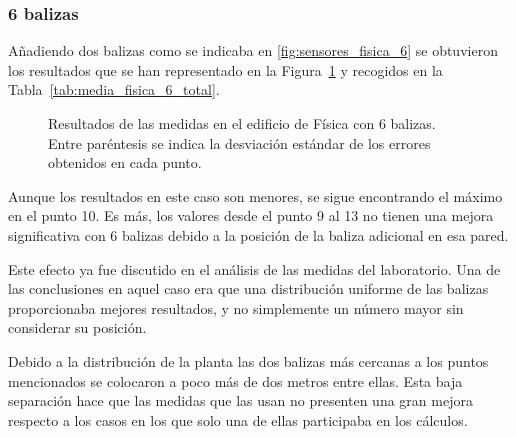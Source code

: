 \subsubsection{6 balizas}

Añadiendo dos balizas como se indicaba en \ref{fig:sensores_fisica_6} se obtuvieron los resultados que se han representado en la Figura~\ref{fig:res_fisica_6} y recogidos en la Tabla~\ref{tab:media_fisica_6_total}.
\begin{figure}[H]
  \centering
  
  \caption{Resultados de las medidas en el edificio de Física con 6 balizas. \newline Entre paréntesis se indica la desviación estándar de los errores obtenidos en cada punto.}
  \label{fig:res_fisica_6}
\end{figure}

Aunque los resultados en este caso son menores, se sigue encontrando el máximo en el punto 10.
Es más, los valores desde el punto 9 al 13 no tienen una mejora significativa con 6 balizas debido a la posición de la baliza adicional en esa pared.

Este efecto ya fue discutido en el análisis de las medidas del laboratorio.
Una de las conclusiones en aquel caso era que una distribución uniforme de las balizas proporcionaba mejores resultados, y no simplemente un número mayor sin considerar su posición.

Debido a la distribución de la planta las dos balizas más cercanas a los puntos mencionados se colocaron a poco más de dos metros entre ellas.
Esta baja separación hace que las medidas que las usan no presenten una gran mejora respecto a los casos en los que solo una de ellas participaba en los cálculos.

